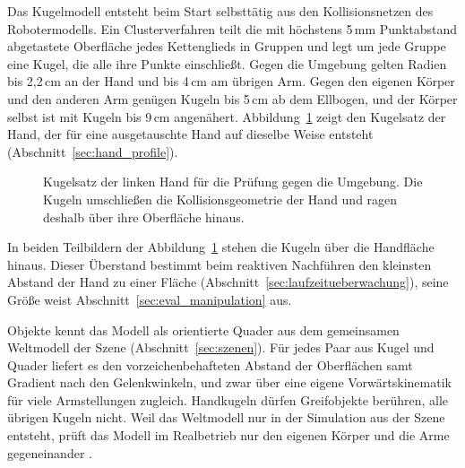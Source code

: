 Das Kugelmodell entsteht beim Start selbsttätig aus den Kollisionsnetzen des Robotermodells.
Ein Clusterverfahren teilt die mit höchstens 5\,mm Punktabstand abgetastete Oberfläche jedes Kettenglieds in Gruppen und legt um jede Gruppe eine Kugel, die alle ihre Punkte einschließt.
Gegen die Umgebung gelten Radien bis 2,2\,cm an der Hand und bis 4\,cm am übrigen Arm.
Gegen den eigenen Körper und den anderen Arm genügen Kugeln bis 5\,cm ab dem Ellbogen, und der Körper selbst ist mit Kugeln bis 9\,cm angenähert.
Abbildung~\ref{fig:kugelmodell} zeigt den Kugelsatz der Hand, der für eine ausgetauschte Hand auf dieselbe Weise entsteht (Abschnitt~\ref{sec:hand_profile}).

\begin{figure}[htbp]
  \centering
  
  \caption[Kugelmodell der Hand]{Kugelsatz der linken Hand für die Prüfung gegen die Umgebung. Die Kugeln umschließen die Kollisionsgeometrie der Hand und ragen deshalb über ihre Oberfläche hinaus.}
  \label{fig:kugelmodell}
\end{figure}

In beiden Teilbildern der Abbildung~\ref{fig:kugelmodell} stehen die Kugeln über die Handfläche hinaus.
Dieser Überstand bestimmt beim reaktiven Nachführen den kleinsten Abstand der Hand zu einer Fläche (Abschnitt~\ref{sec:laufzeitueberwachung}), seine Größe weist Abschnitt~\ref{sec:eval_manipulation} aus.

Objekte kennt das Modell als orientierte Quader aus dem gemeinsamen Weltmodell der Szene (Abschnitt~\ref{sec:szenen}).
Für jedes Paar aus Kugel und Quader liefert es den vorzeichenbehafteten Abstand der Oberflächen samt Gradient nach den Gelenkwinkeln, und zwar über eine eigene Vorwärtskinematik für viele Armstellungen zugleich.
Handkugeln dürfen Greifobjekte berühren, alle übrigen Kugeln nicht.
Weil das Weltmodell nur in der Simulation aus der Szene entsteht, prüft das Modell im Realbetrieb nur den eigenen Körper und die Arme gegeneinander .

